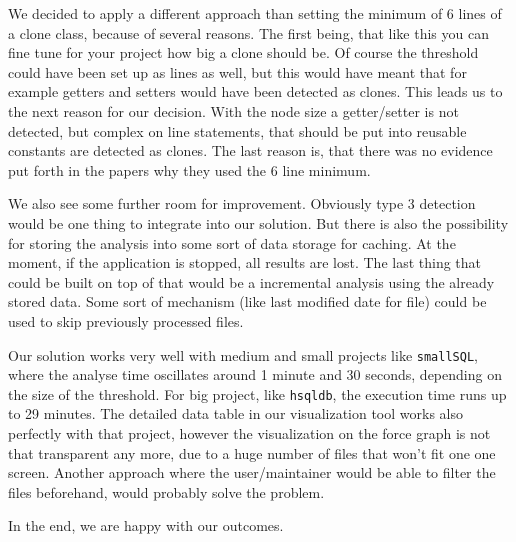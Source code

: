 \documentclass{uva-inf-article}
\begin{document}
We decided to apply a different approach than setting the minimum of 6 lines of a clone class, because of several reasons. The first being, that like this you can fine tune for your project how big a clone should be. Of course the threshold could have been set up as lines as well, but this would have meant that for example getters and setters would have been detected as clones. This leads us to the next reason for our decision. With the node size a getter/setter is not detected, but complex on line statements, that should be put into reusable constants are detected as clones. The last reason is, that there was no evidence put forth in the papers why they used the 6 line minimum.

We also see some further room for improvement. Obviously type 3 detection would be one thing to integrate into our solution. But there is also the possibility for storing the analysis into some sort of data storage for caching. At the moment, if the application is stopped, all results are lost. The last thing that could be built on top of that would be a incremental analysis using the already stored data. Some sort of mechanism (like last modified date for file) could be used to skip previously processed files.

Our solution works very well with medium and small projects like \texttt{smallSQL}, where the analyse time oscillates around 1 minute and 30 seconds, depending on the size of the threshold. For big project, like \texttt{hsqldb}, the execution time runs up to 29 minutes. The detailed data table in our visualization tool works also perfectly with that project, however the visualization on the force graph is not that transparent any more, due to a huge number of files that won't fit one one screen. Another approach where the user/maintainer would be able to filter the files beforehand, would probably solve the problem. 

In the end, we are happy with our outcomes. 


\printbibliography


\end{document}
